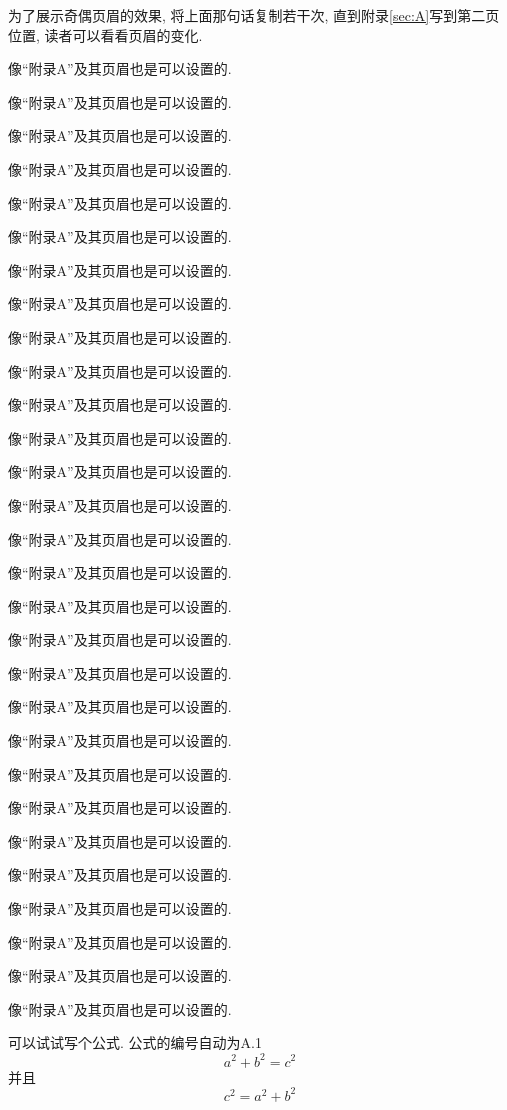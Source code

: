 \documentclass[a4paper]{article}
\begin{document}
\begin{spacing}{1.5}
为了展示奇偶页眉的效果, 将上面那句话复制若干次, 直到附录\ref{sec:A}写到第二页位置, 读者可以看看页眉的变化.

像``附录A''及其页眉也是可以设置的.

像``附录A''及其页眉也是可以设置的.

像``附录A''及其页眉也是可以设置的.

像``附录A''及其页眉也是可以设置的.

像``附录A''及其页眉也是可以设置的.

像``附录A''及其页眉也是可以设置的.

像``附录A''及其页眉也是可以设置的.

像``附录A''及其页眉也是可以设置的.

像``附录A''及其页眉也是可以设置的.

像``附录A''及其页眉也是可以设置的.

像``附录A''及其页眉也是可以设置的.

像``附录A''及其页眉也是可以设置的.

像``附录A''及其页眉也是可以设置的.

像``附录A''及其页眉也是可以设置的.

像``附录A''及其页眉也是可以设置的.

像``附录A''及其页眉也是可以设置的.

像``附录A''及其页眉也是可以设置的.

像``附录A''及其页眉也是可以设置的.

像``附录A''及其页眉也是可以设置的.

像``附录A''及其页眉也是可以设置的.

像``附录A''及其页眉也是可以设置的.

像``附录A''及其页眉也是可以设置的.

像``附录A''及其页眉也是可以设置的.

像``附录A''及其页眉也是可以设置的.

像``附录A''及其页眉也是可以设置的.

像``附录A''及其页眉也是可以设置的.

像``附录A''及其页眉也是可以设置的.

像``附录A''及其页眉也是可以设置的.

像``附录A''及其页眉也是可以设置的.

可以试试写个公式. 公式的编号自动为A.1
\begin{equation}\label{equ:A:1}
a^2+b^2=c^2
\end{equation}
并且
\begin{equation}\label{equ:A:2}
c^2=a^2+b^2
\end{equation}


\end{spacing}
\end{document}
